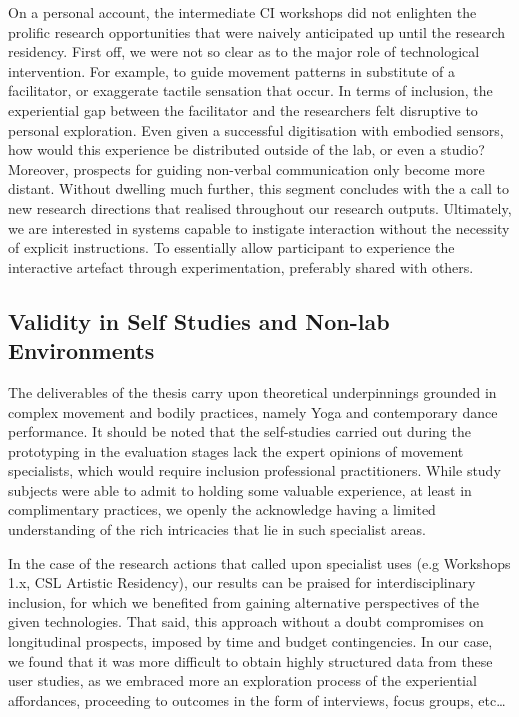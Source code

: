 On a personal account, the intermediate CI workshops did not enlighten the prolific research opportunities that were naively anticipated up until the research residency. First off, we were not so clear as to the major role of technological intervention. For example, to guide movement patterns in substitute of a facilitator, or exaggerate tactile sensation that occur. In terms of inclusion, the experiential gap between the facilitator and the researchers felt disruptive to personal exploration. Even given a successful digitisation with embodied sensors, how would this experience be distributed outside of the lab, or even a studio? Moreover, prospects for guiding non-verbal communication only become more distant. Without dwelling much further, this segment concludes with the a call to new research directions that realised throughout our research outputs. Ultimately, we are interested in systems capable to instigate interaction without the necessity of explicit instructions. To essentially allow participant to experience the interactive artefact through experimentation, preferably shared with others.

\subsection{Validity in Self Studies and Non-lab Environments}

The deliverables of the thesis carry upon theoretical underpinnings grounded in complex movement and bodily practices, namely Yoga and contemporary dance performance. It should be noted that the self-studies carried out during the prototyping in the evaluation stages lack the expert opinions of movement specialists, which would require inclusion professional practitioners. While study subjects were able to admit to holding some valuable experience, at least in complimentary practices, we openly the acknowledge having a limited understanding of the rich intricacies that lie in such specialist areas.

In the case of the research actions that called upon specialist uses (e.g Workshops 1.x, CSL Artistic Residency), our results can be praised for interdisciplinary inclusion, for which we benefited from gaining alternative perspectives of the given technologies. That said, this approach without a doubt compromises on longitudinal prospects, imposed by time and budget contingencies. In our case, we found that it was more difficult to obtain highly structured data from these user studies, as we embraced more an exploration process of the experiential affordances, proceeding to outcomes in the form of interviews, focus groups, etc…

